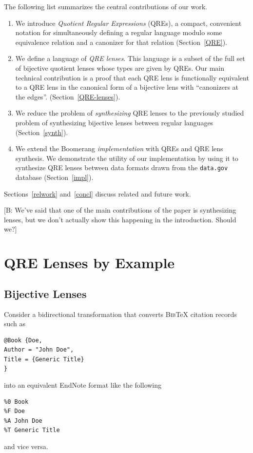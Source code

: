 \documentclass[acmsmall,review,anonymous]{acmart}
\newcommand{\FINISH}[3]{\ifdraft\textcolor{#1}{[#2: #3]}\fi}
\newcommand{\bcp}[1]{\FINISH{dkred}{B}{#1}}
\newcommand{\bibtex}{\textsc{Bib}\TeX{}}
\begin{document}
The following list summarizes the central contributions of our work.
\begin{enumerate}
  \item We introduce {\em Quotient Regular Expressions} (QREs),
  a compact, convenient notation for simultaneously defining a
  regular language modulo some equivalence relation and a canonizer
  for that relation (Section~\ref{QRE}).
  \item We define a language of {\em QRE lenses}.  This language is
  a subset of the full set of bijective quotient
  lenses whose types are given by QREs. Our main technical contribution
  is a proof that each QRE lens is functionally equivalent to a QRE lens in the
  canonical form of a bijective lens with ``canonizers at the edges''.
   (Section~\ref{QRE-lenses}).
  \item We reduce the problem of {\em synthesizing}
  QRE lenses to the previously studied problem of synthesizing bijective lenses
  between regular languages (Section~\ref{synth}).
  \item We extend the Boomerang {\em implementation} with QREs
  and QRE lens synthesis.  We demonstrate the utility of our
  implementation by using it to
  synthesize QRE lenses between data formats drawn from the
  {\tt data.gov} database (Section~\ref{impl}).
\end{enumerate}
Sections~\ref{relwork} and~\ref{concl} discuss related and future work.

\bcp{We've said that one of the main contributions of the paper is
synthesizing lenses, but we don't actually show this happening in the
introduction.  Should we?}

\section{QRE Lenses by Example}
\label{sec:example}
\subsection{Bijective Lenses}
Consider a bidirectional transformation that converts \bibtex{} citation records
such as
\begin{verbatim}
@Book {Doe,
Author = "John Doe",
Title = {Generic Title}
}
\end{verbatim}
\noindent
into an equivalent EndNote format like the following
\begin{verbatim}
%0 Book
%F Doe
%A John Doe
%T Generic Title
\end{verbatim}
\noindent
and vice versa. 
\end{document}
